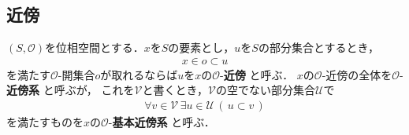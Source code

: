 \subsection{近傍}
	\begin{screen}
		\begin{dfn}[近傍]
			$(S,\mathscr{O})$を位相空間とする．$x$を$S$の要素とし，$u$を$S$の部分集合とするとき，
			\begin{align}
				x \in o \subset u
			\end{align}
			を満たす$\mathscr{O}$-開集合$o$が取れるならば$u$を$x$の$\mathscr{O}$-{\bf 近傍}
			と呼ぶ．
			$x$の$\mathscr{O}$-近傍の全体を$\mathscr{O}$-{\bf 近傍系}
			と呼ぶが，
			これを$\mathcal{V}$と書くとき，$\mathcal{V}$の空でない部分集合$\mathcal{U}$で
			\begin{align}
				\forall v \in \mathcal{V}\, \exists u \in \mathcal{U}\,
				(\, u \subset v\, )
			\end{align}
			を満たすものを$x$の$\mathscr{O}$-{\bf 基本近傍系}
			と呼ぶ．
		\end{dfn}
	\end{screen}
	
